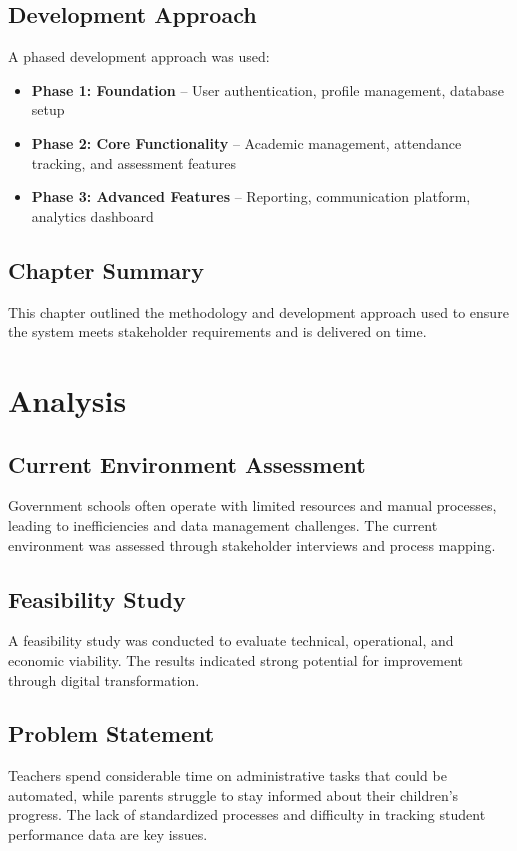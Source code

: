 \documentclass[12pt,a4paper]{report}
\begin{document}
\section{Development Approach}
A phased development approach was used:
\begin{itemize}
    \item \textbf{Phase 1: Foundation} -- User authentication, profile management, database setup
    \item \textbf{Phase 2: Core Functionality} -- Academic management, attendance tracking, and assessment features
    \item \textbf{Phase 3: Advanced Features} -- Reporting, communication platform, analytics dashboard
\end{itemize}

\section{Chapter Summary}
This chapter outlined the methodology and development approach used to ensure the system meets stakeholder requirements and is delivered on time.

\chapter{Analysis}
\section{Current Environment Assessment}
Government schools often operate with limited resources and manual processes, leading to inefficiencies and data management challenges. The current environment was assessed through stakeholder interviews and process mapping.

\section{Feasibility Study}
A feasibility study was conducted to evaluate technical, operational, and economic viability. The results indicated strong potential for improvement through digital transformation.

\section{Problem Statement}
Teachers spend considerable time on administrative tasks that could be automated, while parents struggle to stay informed about their children's progress. The lack of standardized processes and difficulty in tracking student performance data are key issues.
\end{document}
